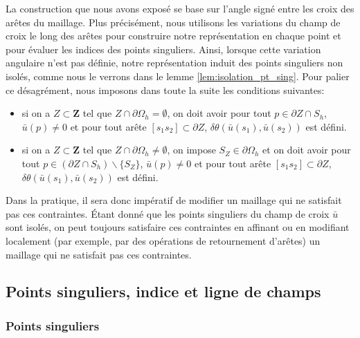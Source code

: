 \begin{remark}
La construction que nous avons exposé se base sur l'angle signé entre les croix des arêtes du maillage. Plus précisément, nous utilisons les variations du champ de croix le long des arêtes pour construire notre représentation en chaque point et pour évaluer les indices des points singuliers. Ainsi, lorsque cette variation angulaire n'est pas définie, notre représentation induit des points singuliers non isolés, comme nous le verrons dans le lemme \ref{lem:isolation_pt_sing}.
Pour palier ce désagrément, nous imposons dans toute la suite les conditions suivantes:\\
\begin{itemize}
 \item si on a $Z\subset\mathbf{Z}$ tel que $Z\cap\partial\Omega_h=\emptyset$, on doit avoir pour tout $p\in\partial Z\cap S_h$, $\bar{u}(p)\neq 0$ et pour tout arête $[s_1s_2]\subset\partial Z$, $\delta\theta(\bar{u}(s_1),\bar{u}(s_2))$ est défini.\\
 \item si on a $Z\subset\mathbf{Z}$ tel que $Z\cap\partial\Omega_h\neq\emptyset$, on impose $S_Z\in\partial\Omega_h$ et on doit avoir pour tout $p\in(\partial Z\cap S_h)\backslash\{S_Z\}$, $\bar{u}(p)\neq 0$ et pour tout arête $[s_1s_2]\subset\partial Z$, $\delta\theta(\bar{u}(s_1),\bar{u}(s_2))$ est défini.\\
\end{itemize}
Dans la pratique, il sera donc impératif de modifier un maillage qui ne satisfait pas ces contraintes. %
Étant donné que les points singuliers du champ de croix $\bar{u}$ sont isolés, on peut toujours satisfaire ces contraintes en affinant ou en modifiant localement (par exemple, par des opérations de retournement d'arêtes) un maillage qui ne satisfait pas ces contraintes.
\end{remark}

\subsection{Points singuliers, indice et ligne de champs}
\label{subsec:pt_sing_ind_lign_champ}

\subsubsection*{Points singuliers}

